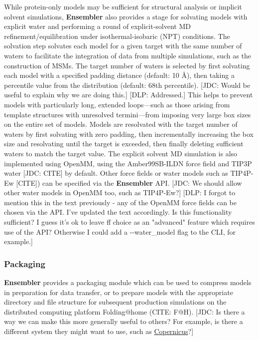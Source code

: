 \documentclass[aps,pre,twocolumn,nofootinbib,superscriptaddress,linenumbers]{revtex4-1}
\begin{document}
While protein-only models may be sufficient for structural analysis or implicit solvent simulations, {\bf Ensembler} also provides a stage for solvating models with explicit water and performing a round of explicit-solvent MD refinement/equilibration under isothermal-isobaric (NPT) conditions.
The solvation step solvates each model for a given target with the same number of waters to facilitate the integration of data from multiple simulations, such as the construction of MSMs.
The target number of waters is selected by first solvating each model with a specified padding distance (default: 10 \AA), then taking a percentile value from the distribution (default: 68th percentile).
{\color{red}[JDC: Would be useful to explain why we are doing this.]}
{\color{blue}[DLP: Addressed.]}
This helps to prevent models with particularly long, extended loops---such as those arising from template structures with unresolved termini---from imposing very large box sizes on the entire set of models.
Models are resolvated with the target number of waters by first solvating with zero padding, then incrementally increasing the box size and resolvating until the target is exceeded, then finally deleting sufficient waters to match the target value.
The explicit solvent MD simulation is also implemented using OpenMM, using the Amber99SB-ILDN force field and TIP3P water {\color{red}[JDC: CITE]} by default.
Other force fields or water models such as TIP4P-Ew {\color{red}[CITE]}) can be specified via the {\bf Ensembler} API.
{\color{red}[JDC: We should allow other water models in OpenMM too, such as TIP4P-Ew?]}
{\color{blue}[DLP: I forgot to mention this in the text previously - any of the OpenMM force fields can be chosen via the API. I've updated the text accordingly. Is this functionality sufficient? I guess it's ok to leave ff choice as an "advanced" feature which requires use of the API? Otherwise I could add a -{}-water\_model flag to the CLI, for example.]}

\subsubsection*{Packaging}

{\bf Ensembler} provides a packaging module which can be used to compress models in preparation for data transfer, or to prepare models with the appropriate directory and file structure for subsequent production simulations on the distributed computing platform Folding@home (CITE: F@H).
{\color{red}[JDC: Is there a way we can make this more generally useful to others?  For example, is there a different system they might want to use, such as \href{http://copernicus.readthedocs.org/en/latest/tutorials/md-tutorial.html#creating-a-workflow-for-molecular-simulations}{Copernicus}?]}
\end{document}

